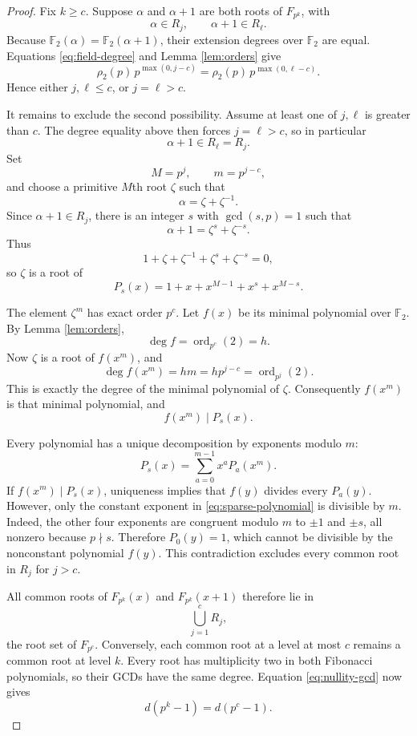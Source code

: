 \documentclass[a4paper]{article}
\newcommand{\F}{\mathbb{F}}
\newcommand{\ord}[2][]{\operatorname{ord}_{#1}\!\left(#2\right)}
\begin{document}
\begin{proof}
	Fix $k\geq c$.
	Suppose $\alpha$ and $\alpha+1$ are both roots of $F_{p^k}$, with
	\[
		\alpha\in R_j,\qquad \alpha+1\in R_\ell.
	\]
	Because $\F_2(\alpha)=\F_2(\alpha+1)$, their extension degrees over $\F_2$ are equal.
	Equations \eqref{eq:field-degree} and Lemma \ref{lem:orders} give
	\[
		\rho_2(p)\,p^{\max(0,j-c)}
		=
		\rho_2(p)\,p^{\max(0,\ell-c)}.
	\]
	Hence either $j,\ell\leq c$, or $j=\ell>c$.

	It remains to exclude the second possibility.
	Assume at least one of $j,\ell$ is greater than $c$.
	The degree equality above then forces $j=\ell>c$, so in particular
	\[
		\alpha+1\in R_\ell=R_j.
	\]
	Set
	\[
		M=p^j,\qquad m=p^{j-c},
	\]
	and choose a primitive $M$th root $\zeta$ such that
	\[
		\alpha=\zeta+\zeta^{-1}.
	\]
	Since $\alpha+1\in R_j$, there is an integer $s$ with $\gcd(s,p)=1$ such that
	\[
		\alpha+1=\zeta^s+\zeta^{-s}.
	\]
	Thus
	\[
		1+\zeta+\zeta^{-1}+\zeta^s+\zeta^{-s}=0,
	\]
	so $\zeta$ is a root of
	\begin{equation}\label{eq:sparse-polynomial}
		P_s(x)=1+x+x^{M-1}+x^s+x^{M-s}.
	\end{equation}

	The element $\zeta^m$ has exact order $p^c$.
	Let $f(x)$ be its minimal polynomial over $\F_2$.
	By Lemma \ref{lem:orders},
	\[
		\deg f=\ord[p^c]{2}=h.
	\]
	Now $\zeta$ is a root of $f(x^m)$, and
	\[
		\deg f(x^m)=hm
		=h p^{j-c}
		=\ord[p^j]{2}.
	\]
	This is exactly the degree of the minimal polynomial of $\zeta$.
	Consequently $f(x^m)$ is that minimal polynomial, and
	\[
		f(x^m)\mid P_s(x).
	\]

	Every polynomial has a unique decomposition by exponents modulo $m$:
	\[
		P_s(x)=\sum_{a=0}^{m-1}x^aP_a(x^m).
	\]
	If $f(x^m)\mid P_s(x)$, uniqueness implies that $f(y)$ divides every $P_a(y)$.
	However, only the constant exponent in \eqref{eq:sparse-polynomial} is divisible by $m$.
	Indeed, the other four exponents are congruent modulo $m$ to $\pm1$ and $\pm s$, all nonzero because $p\nmid s$.
	Therefore $P_0(y)=1$, which cannot be divisible by the nonconstant polynomial $f(y)$.
	This contradiction excludes every common root in $R_j$ for $j>c$.

	All common roots of $F_{p^k}(x)$ and $F_{p^k}(x+1)$ therefore lie in
	\[
		\bigcup_{j=1}^cR_j,
	\]
	the root set of $F_{p^c}$.
	Conversely, each common root at a level at most $c$ remains a common root at level $k$.
	Every root has multiplicity two in both Fibonacci polynomials, so their GCDs have the same degree.
	Equation \eqref{eq:nullity-gcd} now gives
	\[
		d(p^k-1)=d(p^c-1).
	\]
\end{proof}
\end{document}
